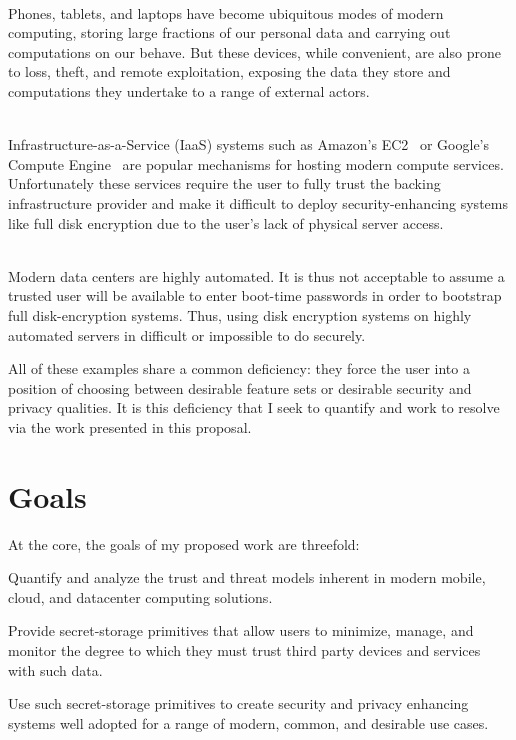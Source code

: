 \begin{packed_desc}
\item[Mobile Computing Devices] \hfill \\
  Phones, tablets, and laptops have become ubiquitous modes of modern
  computing, storing large fractions of our personal data and carrying
  out computations on our behave. But these devices, while convenient,
  are also prone to loss, theft, and remote exploitation, exposing the
  data they store and computations they undertake to a range of
  external actors.
\item[Cloud Computing Infrastructure] \hfill \\
  Infrastructure-as-a-Service (IaaS) systems such as Amazon's
  EC2~\cite{amazon-ec2} or Google's Compute
  Engine~\cite{google-compute} are popular mechanisms for hosting
  modern compute services. Unfortunately these services require the
  user to fully trust the backing infrastructure provider and make it
  difficult to deploy security-enhancing systems like full disk
  encryption due to the user's lack of physical server access.
\item[Datacenter Infrastructure] \hfill \\
  Modern data centers are highly automated. It is thus not acceptable to
  assume a trusted user will be available to enter boot-time passwords in
  order to bootstrap full disk-encryption systems. Thus, using
  disk encryption systems on highly automated servers in difficult or
  impossible to do securely.
\end{packed_desc}

All of these examples share a common deficiency: they force the user
into a position of choosing between desirable feature sets or
desirable security and privacy qualities. It is this deficiency that I
seek to quantify and work to resolve via the work presented in this
proposal.

\section{Goals}
\label{chap:intro:goals}

At the core, the goals of my proposed work are threefold:

\begin{packed_item}
\item Quantify and analyze the trust and threat models inherent in
  modern mobile, cloud, and datacenter computing solutions.
\item Provide secret-storage primitives that allow users to minimize,
  manage, and monitor the degree to which they must trust third party
  devices and services with such data.
\item Use such secret-storage primitives to create security and
  privacy enhancing systems well adopted for a range of modern,
  common, and desirable use cases.
\end{packed_item}

